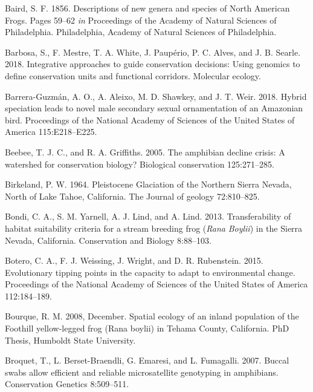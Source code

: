 \documentclass[proquest,12pt,final]{ucthesis-CA2012} %
\begin{document}
\begin{ucmainmatter}
\leavevmode\hypertarget{ref-baird_descriptions_1856}{}%
Baird, S. F. 1856. Descriptions of new genera and species of North
American Frogs. Pages 59--62 \emph{in} Proceedings of the Academy of
Natural Sciences of Philadelphia. Philadelphia, Academy of Natural
Sciences of Philadelphia.

\leavevmode\hypertarget{ref-barbosa_integrative_2018}{}%
Barbosa, S., F. Mestre, T. A. White, J. Paupério, P. C. Alves, and J. B.
Searle. 2018. Integrative approaches to guide conservation decisions:
Using genomics to define conservation units and functional corridors.
Molecular ecology.

\leavevmode\hypertarget{ref-barrera-guzman_hybrid_2018}{}%
Barrera-Guzmán, A. O., A. Aleixo, M. D. Shawkey, and J. T. Weir. 2018.
Hybrid speciation leads to novel male secondary sexual ornamentation of
an Amazonian bird. Proceedings of the National Academy of Sciences of
the United States of America 115:E218--E225.

\leavevmode\hypertarget{ref-beebee_amphibian_2005}{}%
Beebee, T. J. C., and R. A. Griffiths. 2005. The amphibian decline
crisis: A watershed for conservation biology? Biological conservation
125:271--285.

\leavevmode\hypertarget{ref-birkeland_pleistocene_1964}{}%
Birkeland, P. W. 1964. Pleistocene Glaciation of the Northern Sierra
Nevada, North of Lake Tahoe, California. The Journal of geology
72:810--825.

\leavevmode\hypertarget{ref-bondi_transferability_2013}{}%
Bondi, C. A., S. M. Yarnell, A. J. Lind, and A. Lind. 2013.
Transferability of habitat suitability criteria for a stream breeding
frog (\emph{Rana} \emph{Boylii}) in the Sierra Nevada, California.
Conservation and Biology 8:88--103.

\leavevmode\hypertarget{ref-botero_evolutionary_2015}{}%
Botero, C. A., F. J. Weissing, J. Wright, and D. R. Rubenstein. 2015.
Evolutionary tipping points in the capacity to adapt to environmental
change. Proceedings of the National Academy of Sciences of the United
States of America 112:184--189.

\leavevmode\hypertarget{ref-bourque_spatial_2008}{}%
Bourque, R. M. 2008, December. Spatial ecology of an inland population
of the Foothill yellow-legged frog (Rana boylii) in Tehama County,
California. PhD Thesis, Humboldt State University.

\leavevmode\hypertarget{ref-broquet_buccal_2007}{}%
Broquet, T., L. Berset-Braendli, G. Emaresi, and L. Fumagalli. 2007.
Buccal swabs allow efficient and reliable microsatellite genotyping in
amphibians. Conservation Genetics 8:509--511.


\end{ucmainmatter}
\end{document}
